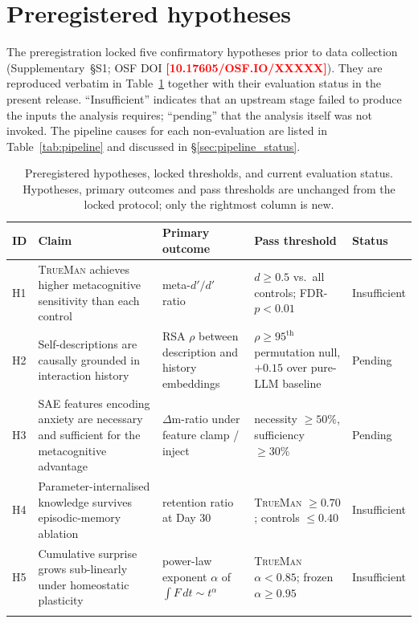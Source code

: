 \documentclass[pdflatex,sn-mathphys-num]{sn-jnl}
\newcommand{\TrueMan}{\textsc{TrueMan}}
\newcommand{\PLACE}[1]{\textcolor{red}{\textbf{[#1]}}}
\theoremstyle{thmstyleone}
\theoremstyle{thmstylethree}
\begin{document}
\section{Preregistered hypotheses}\label{sec:preregistration}

The preregistration locked five confirmatory hypotheses prior to data collection (Supplementary~\S S1; OSF DOI \PLACE{10.17605/OSF.IO/XXXXX}). They are reproduced verbatim in Table~\ref{tab:hypotheses} together with their evaluation status in the present release. ``Insufficient'' indicates that an upstream stage failed to produce the inputs the analysis requires; ``pending'' that the analysis itself was not invoked. The pipeline causes for each non-evaluation are listed in Table~\ref{tab:pipeline} and discussed in \S\ref{sec:pipeline_status}.

\begin{table}[h]
\caption{Preregistered hypotheses, locked thresholds, and current evaluation status. Hypotheses, primary outcomes and pass thresholds are unchanged from the locked protocol; only the rightmost column is new.}
\label{tab:hypotheses}
\small
\begin{tabular}{@{}p{0.4cm}p{4.4cm}p{3.4cm}p{2.4cm}p{1.4cm}@{}}
\toprule
ID & Claim & Primary outcome & Pass threshold & Status \\
\midrule
H1 & \TrueMan{} achieves higher metacognitive sensitivity than each control & meta-$d'/d'$ ratio~\cite{maniscalco2012meta} & $d \geq 0.5$ vs.\ all controls; FDR-$p < 0.01$ & Insufficient \\
H2 & Self-descriptions are causally grounded in interaction history & RSA $\rho$ between description and history embeddings & $\rho \geq 95^{\text{th}}$ permutation null, $+0.15$ over pure-LLM baseline & Pending \\
H3 & SAE features encoding anxiety are necessary and sufficient for the metacognitive advantage & $\Delta$m-ratio under feature clamp / inject & necessity $\geq 50\%$, sufficiency $\geq 30\%$ & Pending \\
H4 & Parameter-internalised knowledge survives episodic-memory ablation & retention ratio at Day 30 & \TrueMan{} $\geq 0.70$; controls $\leq 0.40$ & Insufficient \\
H5 & Cumulative surprise grows sub-linearly under homeostatic plasticity & power-law exponent $\alpha$ of $\int F\,dt \sim t^\alpha$ & \TrueMan{} $\alpha < 0.85$; frozen $\alpha \geq 0.95$ & Insufficient \\
\botrule
\end{tabular}
\end{table}
\end{document}
